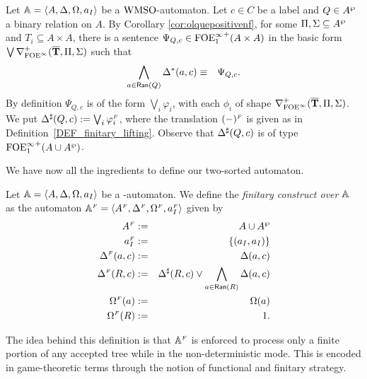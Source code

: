 \begin{definition}\label{PROP_DeltaPowerset}
Let $\mathbb{A} = \langle{A,\Delta,\Omega,a_I}\rangle$ be a $\mathrm{WMSO}$-automaton. Let $c \in C$ be a label and $Q \in A^{\wp}$ a binary relation on $A$. By Corollary \ref{cor:olquepositivenf}, for some $\Pi,\Sigma \subseteq A^{\wp}$ and $T_i \subseteq A \times A$, there is a sentence $\Psi_{Q,c} \in {\ensuremath{\mathrm{FOE}^{\infty}_1}}^+(A\times A)$ in the basic form $\bigvee \nabla^+_{\mathrm{FOE}^{\infty}}(\overline{{\mathbf{T}}},\Pi,\Sigma)$ such that
\begin{eqnarray*}
  \bigwedge_{a \in \mathsf{Ran}(Q)} \Delta^{*}(a,c) &\equiv& \Psi_{Q,c}.
\end{eqnarray*}
By definition $\Psi_{Q,c}$ is of the form $\bigvee_{i}\varphi_i$, with each $\phi_{i}$ of shape $\nabla^+_{\mathrm{FOE}^{\infty}}(\overline{{\mathbf{T}}},\Pi,\Sigma)$. We put $\Delta^{\sharp}(Q,c) := \bigvee_{i}\varphi_i^{{\scriptscriptstyle F}}$, where the translation $(-)^{{\scriptscriptstyle F}}$ is given as in Definition~\ref{DEF_finitary_lifting}. Observe that $\Delta^{\sharp}(Q,c)$ is of type ${\mathrm{FOE}^{\infty}_1}^+(A \cup A^{\wp})$.
\end{definition}

We have now all the ingredients to define our two-sorted automaton.

\begin{definition}\label{def:finitaryconstruct}
Let $\mathbb{A} = \langle{A,\Delta,\Omega,a_I}\rangle$ be a {\wmso-automaton}. We define the \emph{finitary construct over $\mathbb{A}$} as the automaton $\mathbb{A}^{{\scriptscriptstyle F}} = \langle{A^{{\scriptscriptstyle F}},\Delta^{{\scriptscriptstyle F}},\Omega^{{\scriptscriptstyle F}},a_I^{{\scriptscriptstyle F}}}\rangle$ given by
\begin{eqnarray*}
        A^{{\scriptscriptstyle F}} &:=& A \cup A^{\wp} \\
        a_I^{{\scriptscriptstyle F}} &:=& \{(a_I,a_I)\}\\
        \Delta^{{\scriptscriptstyle F}}(a,c) &:=& \Delta(a,c)\\
        \Delta^{{\scriptscriptstyle F}}(R,c) &:=& \Delta^{\sharp}(R,c) \vee \bigwedge_{a \in \mathsf{Ran}(R)} \Delta(a,c)\\
        \Omega^{{\scriptscriptstyle F}}(a) &:=& \Omega(a)\\
        \Omega^{{\scriptscriptstyle F}}(R) &:=& 1.
      \end{eqnarray*}
\end{definition}

The idea behind this definition is that $\mathbb{A}^{{\scriptscriptstyle F}}$ is enforced to process only a finite portion of any accepted tree while in the non-deterministic mode. This is encoded in game-theoretic terms through the notion of functional and finitary strategy. 

